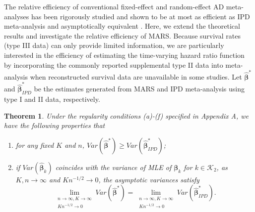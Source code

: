 \documentclass[12pt]{article}
\theoremstyle{mystyle}
\newtheorem{theorem}{Theorem}
\begin{document}
The relative efficiency of conventional fixed-effect and random-effect AD meta-analyses has been rigorously studied and shown to be at most as efficient as IPD meta-analysis and asymptotically equivalent \citep{lin2010relative,chen2020relative}.  
Here, we extend the theoretical results and investigate the relative efficiency of MARS. Because survival rates (type III data) can only provide limited information, we are particularly interested in the efficiency of estimating the time-varying hazard ratio function by incorporating the commonly reported supplemental type II data into meta-analysis when reconstructed survival data are unavailable in some studies. 
Let $\hat{\boldsymbol\beta}^*$ and $\hat{\boldsymbol\beta}^*_{IPD}$ be the estimates generated from MARS and IPD meta-analysis using type I and II data, respectively. 

\begin{theorem}
Under the regularity conditions (a)-(f) specified in Appendix A, we have the following properties that
\begin{enumerate}
    \item for any fixed $K$ and $n$, 
    $Var(\hat{\boldsymbol\beta}^*)\geq Var(\hat{\boldsymbol\beta}^*_{IPD})$;
    \item if $Var(\hat{\boldsymbol\beta}_k)$ coincides with the variance of MLE of $\boldsymbol\beta_k$ for $k\in\mathcal{K}_2$, as $K,n\rightarrow\infty$ and $Kn^{-1/2}\rightarrow 0$, the asymptotic variances satisfy $$\lim_{\substack{n \to \infty, K \to \infty \\ Kn^{-1/2}\rightarrow 0}}
    Var(\hat{\boldsymbol\beta}^*)=\lim_{\substack{n \to \infty, K \to \infty \\ Kn^{-1/2}\rightarrow 0}} Var(\hat{\boldsymbol\beta}^*_{IPD}).$$
\end{enumerate}
\end{theorem}
\end{document}
